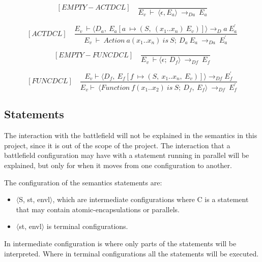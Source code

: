    	\[
   	[EMPTY-ACTDCL] \quad
   	\dfrac{}{E_v \ \vdash \ \langle \epsilon, E_a \rangle \ \rightarrow_{Da} \ E_a}
   	\]
    	
    	
  	\[
   	[ACTDCL] \quad
   	\dfrac{E_v \ \vdash \langle D_a, \ E_a[a \ \mapsto (S, \ (x_1 .. x_n) \ E_v)] \rangle \rightarrow_Da \ E_a^{'}}{E_v \ \vdash \ Action \ a(x_1 .. x_n) \ is \ S; \ D_a \ E_a \ \rightarrow_{Da} \ E_a^{'}}
   	\]
    	
   	\[
   	[EMPTY-FUNCDCL] \quad
   	\dfrac{}{E_v \ \vdash \langle \epsilon; \ D_f \rangle \ \rightarrow_{Df} \ E_f}
   	\]
   	
   	\[
   	[FUNCDCL] \quad
   	\dfrac{E_v \vdash \langle D_f, \ E_f[f \ \mapsto (S, \ x_1 .. x_n, \ E_v)] \rangle \rightarrow_{Df} E_f^{'}}{E_v \vdash \ \langle Function \ f(x_1 .. x_2) \ is \ S; \ D_f, \ E_f \rangle \ \rightarrow_{Df} \ E_f^{'}}
   	\]
   	\subsection{Statements}
   	The interaction with the battlefield will not be explained in the semantics in this project, since it is out of the scope of the project. The interaction that a battlefield configuration may have with a statement running in parallel will be explained, but only for when it moves from one configuration to another.
   	
   	The configuration of the semantics statements are:
   	
   	\begin{itemize}
   		\item \begin{math} \langle \end{math}S, st, envl\begin{math} \rangle \end{math}, which are intermediate configurations where C is a statement that may contain atomic-encapsulations or parallels.
   		\item \begin{math} \langle \end{math}st, envl\begin{math} \rangle \end{math} is terminal configurations.
   	\end{itemize}
   	
   	In intermediate configuration is where only parts of the statements will be interpreted. Where in terminal configurations  all the statements will be executed.
   	
